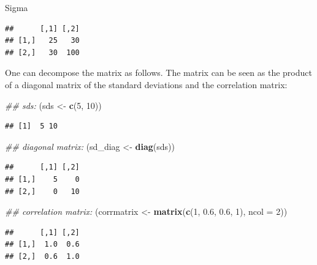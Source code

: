 \documentclass[12pt,]{krantz}
\newenvironment{Shaded}{\begin{snugshade}}{\end{snugshade}}
\newcommand{\CommentTok}[1]{\textcolor[rgb]{0.56,0.35,0.01}{\textit{#1}}}
\newcommand{\DataTypeTok}[1]{\textcolor[rgb]{0.13,0.29,0.53}{#1}}
\newcommand{\DecValTok}[1]{\textcolor[rgb]{0.00,0.00,0.81}{#1}}
\newcommand{\FloatTok}[1]{\textcolor[rgb]{0.00,0.00,0.81}{#1}}
\newcommand{\KeywordTok}[1]{\textcolor[rgb]{0.13,0.29,0.53}{\textbf{#1}}}
\newcommand{\NormalTok}[1]{#1}
\newcommand{\StringTok}[1]{\textcolor[rgb]{0.31,0.60,0.02}{#1}}
\begin{document}
\begin{Shaded}
\begin{Highlighting}[]
\NormalTok{Sigma}
\end{Highlighting}
\end{Shaded}

\begin{verbatim}
##      [,1] [,2]
## [1,]   25   30
## [2,]   30  100
\end{verbatim}

One can decompose the matrix as follows. The matrix can be seen as the product of a diagonal matrix of the standard deviations and the correlation matrix:

\begin{Shaded}
\begin{Highlighting}[]
\CommentTok{## sds:}
\NormalTok{(sds <-}\StringTok{ }\KeywordTok{c}\NormalTok{(}\DecValTok{5}\NormalTok{, }\DecValTok{10}\NormalTok{))}
\end{Highlighting}
\end{Shaded}

\begin{verbatim}
## [1]  5 10
\end{verbatim}

\begin{Shaded}
\begin{Highlighting}[]
\CommentTok{## diagonal matrix:}
\NormalTok{(sd_diag <-}\StringTok{ }\KeywordTok{diag}\NormalTok{(sds))}
\end{Highlighting}
\end{Shaded}

\begin{verbatim}
##      [,1] [,2]
## [1,]    5    0
## [2,]    0   10
\end{verbatim}

\begin{Shaded}
\begin{Highlighting}[]
\CommentTok{## correlation matrix:}
\NormalTok{(corrmatrix <-}\StringTok{ }\KeywordTok{matrix}\NormalTok{(}\KeywordTok{c}\NormalTok{(}\DecValTok{1}\NormalTok{, }\FloatTok{0.6}\NormalTok{, }\FloatTok{0.6}\NormalTok{, }\DecValTok{1}\NormalTok{), }\DataTypeTok{ncol =} \DecValTok{2}\NormalTok{))}
\end{Highlighting}
\end{Shaded}

\begin{verbatim}
##      [,1] [,2]
## [1,]  1.0  0.6
## [2,]  0.6  1.0
\end{verbatim}
\end{document}

